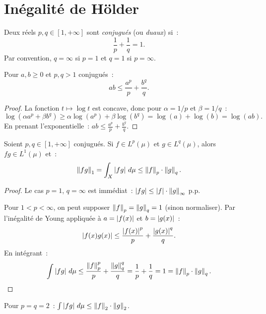 \section{In\'egalit\'e de H\"older}

\begin{definition}
Deux r\'eels $p, q \in [1, +\infty]$ sont \emph{conjugu\'es} (ou \emph{duaux})
si~:
\[
\frac{1}{p} + \frac{1}{q} = 1.
\]
Par convention, $q = \infty$ si $p = 1$ et $q = 1$ si $p = \infty$.
\end{definition}

\begin{lemme}
Pour $a, b \geq 0$ et $p, q > 1$ conjugu\'es~:
\[
ab \leq \frac{a^p}{p} + \frac{b^q}{q}.
\]
\end{lemme}

\begin{proof}
La fonction $t \mapsto \log t$ est concave, donc pour $\alpha = 1/p$ et
$\beta = 1/q$~:
\[
\log(\alpha a^p + \beta b^q) \geq \alpha \log(a^p) + \beta \log(b^q)
= \log(a) + \log(b) = \log(ab).
\]
En prenant l'exponentielle~: $ab \leq \frac{a^p}{p} + \frac{b^q}{q}$.
\end{proof}

\begin{theoreme}
\label{thm:holder}
Soient $p, q \in [1, +\infty]$ conjugu\'es. Si $f \in L^p(\mu)$ et
$g \in L^q(\mu)$, alors $fg \in L^1(\mu)$ et~:
\[
\left\| fg \right\|_1 = \int_X \left| fg \right|\, d\mu \leq \left\| f \right\|_p \cdot \left\| g \right\|_q.
\]
\end{theoreme}

\begin{proof}
Le cas $p = 1$, $q = \infty$ est imm\'ediat~: $\left| fg \right| \leq \left| f \right| \cdot
\left\| g \right\|_\infty$ p.p.

Pour $1 < p < \infty$, on peut supposer $\left\| f \right\|_p = \left\| g \right\|_q = 1$ (sinon
normaliser). Par l'in\'egalit\'e de Young appliqu\'ee \`a $a = \left| f(x) \right|$ et
$b = \left| g(x) \right|$~:
\[
\left| f(x) g(x) \right| \leq \frac{\left| f(x) \right|^p}{p} + \frac{\left| g(x) \right|^q}{q}.
\]
En int\'egrant~:
\[
\int \left| fg \right|\, d\mu \leq \frac{\left\| f \right\|_p^p}{p} + \frac{\left\| g \right\|_q^q}{q}
= \frac{1}{p} + \frac{1}{q} = 1 = \left\| f \right\|_p \cdot \left\| g \right\|_q. \qedhere
\]
\end{proof}

\begin{corollaire}
Pour $p = q = 2$~: $\int \left| fg \right|\, d\mu \leq \left\| f \right\|_2 \cdot \left\| g \right\|_2$.
\end{corollaire}


